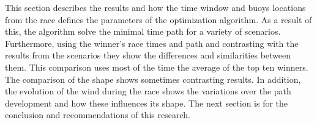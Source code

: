 This section describes the results and how the time window and buoys locations from the race defines the parameters of the optimization algorithm. As a result of this, the algorithm solve the minimal time path for a variety of scenarios.   %
Furthermore, using the winner's race times and path  and contrasting with the results from the scenarios they show the differences and similarities between them. This comparison uses most of the time the average of the top ten winners. The comparison of the shape shows sometimes contrasting results. In addition, the evolution of the wind during the race shows the variations over the path development and how these influences its shape. 
The next section is for the conclusion and recommendations of this research. \par 

